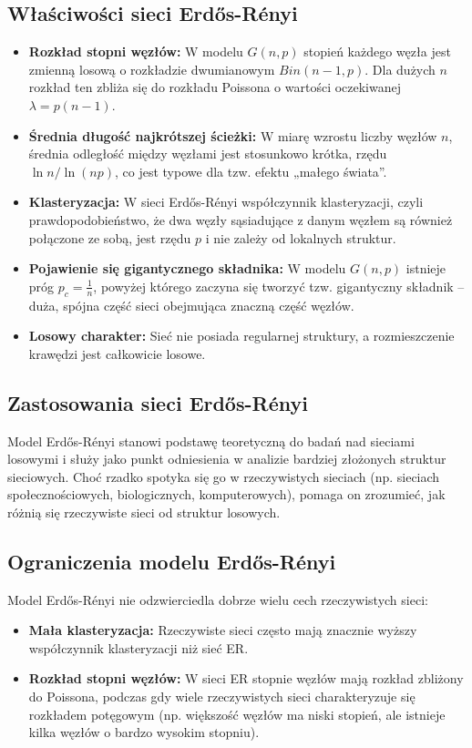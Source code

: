 \subsection{Właściwości sieci Erdős-Rényi}
\begin{itemize}
      \item \textbf{Rozkład stopni węzłów:} W modelu $G(n, p)$ stopień każdego węzła jest zmienną losową o rozkładzie dwumianowym $Bin(n - 1, p)$.
            Dla dużych $n$ rozkład ten zbliża się do rozkładu Poissona o wartości oczekiwanej $\lambda = p(n - 1)$.
      \item \textbf{Średnia długość najkrótszej ścieżki:} W miarę wzrostu liczby węzłów $n$, średnia odległość między węzłami jest stosunkowo krótka, rzędu $\ln n / \ln (np)$,
            co jest typowe dla tzw. efektu „małego świata”.
      \item \textbf{Klasteryzacja:} W sieci Erdős-Rényi współczynnik klasteryzacji, czyli prawdopodobieństwo, że dwa węzły sąsiadujące z danym węzłem są również połączone ze sobą,
            jest rzędu $p$ i nie zależy od lokalnych struktur.
      \item \textbf{Pojawienie się gigantycznego składnika:} W modelu $G(n, p)$ istnieje próg $p_c = \frac{1}{n}$,
            powyżej którego zaczyna się tworzyć tzw. gigantyczny składnik – duża, spójna część sieci obejmująca znaczną część węzłów.
      \item \textbf{Losowy charakter:} Sieć nie posiada regularnej struktury, a rozmieszczenie krawędzi jest całkowicie losowe.
\end{itemize}

\subsection{Zastosowania sieci Erdős-Rényi}
Model Erdős-Rényi stanowi podstawę teoretyczną do badań nad sieciami losowymi i służy jako punkt odniesienia w analizie bardziej złożonych struktur sieciowych.
Choć rzadko spotyka się go w rzeczywistych sieciach (np. sieciach społecznościowych, biologicznych, komputerowych), pomaga on zrozumieć, jak różnią się rzeczywiste sieci od struktur losowych.

\subsection{Ograniczenia modelu Erdős-Rényi}
Model Erdős-Rényi nie odzwierciedla dobrze wielu cech rzeczywistych sieci:
\begin{itemize}
      \item \textbf{Mała klasteryzacja:} Rzeczywiste sieci często mają znacznie wyższy współczynnik klasteryzacji niż sieć ER.
      \item \textbf{Rozkład stopni węzłów:} W sieci ER stopnie węzłów mają rozkład zbliżony do Poissona,
            podczas gdy wiele rzeczywistych sieci charakteryzuje się rozkładem potęgowym (np. większość węzłów ma niski stopień, ale istnieje kilka węzłów o bardzo wysokim stopniu).
\end{itemize}